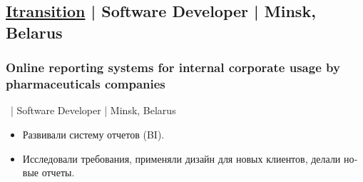 \documentclass[a4paper]{article}
\begin{document}
\begin{minipage}[t]{0.6\textwidth}
    \subsection*{\href{http://www.itransition.com/}{Itransition} | Software Developer | Minsk, Belarus}
	\subsubsection*{Online reporting systems for internal corporate usage by pharmaceuticals companies}
    \ | Software Developer | Minsk, Belarus
	\begin{otherlanguage}{russian}
      \begin{itemize}
        \item Развивали систему отчетов (BI). 
        \item Исследовали требования, применяли дизайн для новых клиентов, делали новые отчеты.
      \end{itemize}
	\end{otherlanguage}

  \end{minipage}
\end{document}
